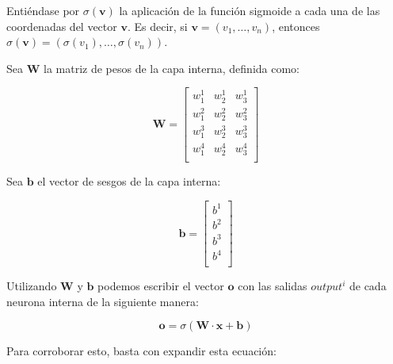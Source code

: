 \documentclass[a4paper, 10pt, twoside]{article}
\begin{document}
Entiéndase por $\sigma(\bm{v})$ la aplicación de la función sigmoide a cada una
de las coordenadas del vector $\bm{v}$. Es decir, si $\bm{v} = (v_1, \ldots,
v_n)$, entonces  $\sigma(\bm{v}) = (\sigma(v_1), \ldots, \sigma(v_n))$.

Sea $\bm{W}$ la matriz de pesos de la capa interna, definida como:

$$
\bm{W} =
\begin{bmatrix}
  w_1^1 & w_2^1 & w_3^1 \\
  w_1^2 & w_2^2 & w_3^2 \\
  w_1^3 & w_2^3 & w_3^3 \\
  w_1^4 & w_2^4 & w_3^4 \\
\end{bmatrix}
$$

Sea $\bm{b}$ el vector de sesgos de la capa interna:

$$
\bm{b} =
\begin{bmatrix}
  b^1 \\
  b^2 \\
  b^3 \\
  b^4 \\
\end{bmatrix}
$$

Utilizando $\bm{W}$ y $\bm{b}$ podemos escribir el vector $\bm{o}$ con las
salidas $\mathit{output}^i$ de cada neurona interna de la siguiente manera:

$$
\bm{o} = \sigma(\bm{W} \cdot \bm{x} + \bm{b})
$$

Para corroborar esto, basta con expandir esta ecuación:
\end{document}
